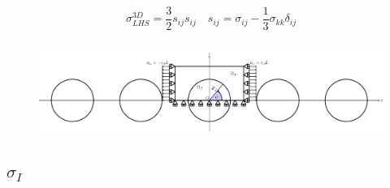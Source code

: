 \documentclass[first,firstsupp,lastsupp,last,hyperref,table]{ETHclass}
\begin{document}
\begin{frame}
\begin{columns}[c]
\begin{column}{0.5\textwidth}
\begin{figure}
\end{figure}
\scriptsize
\begin{equation*}
\sigma^{3D}_{LHS}=\frac{3}{2}s_{ij}s_{ij}\quad s_{ij}=\sigma_{ij}-\frac{1}{3}\sigma_{kk}\delta_{ij}
\end{equation*}
\end{column}
\end{columns}
\vspace{-0.4cm}
\centering
\begin{figure}
\centering
\includegraphics[width=\textwidth]{refAngle.pdf}
\end{figure}
\end{frame}

\subsection{$\sigma_{I}$}
\end{document}
